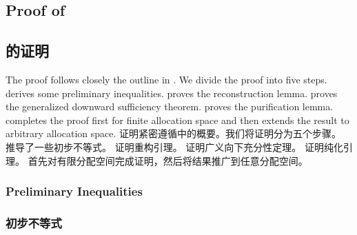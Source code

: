 \documentclass[12pt,letterpaper]{article}
\newenvironment{original}{\color{black}\noindent}{}
\newenvironment{translation}{\color{blue}\noindent}{}
\theoremstyle{plain}
\theoremstyle{definition}
\theoremstyle{remark}
\renewcommand{\1}{\mathds{1}}
\theoremstyle{definition}
\begin{document}
\begin{original}
\subsection{Proof of \texorpdfstring{}{}}
\end{original}
\begin{translation}
\subsection{\texorpdfstring{}{}的证明}
\end{translation}

\begin{original}
The proof follows closely the outline in . We divide the proof into five steps.  derives some preliminary inequalities.  proves the reconstruction lemma.  proves the generalized downward sufficiency theorem.  proves the purification lemma.  completes the proof first for finite allocation space and then extends the result to arbitrary allocation space.
\end{original}
\begin{translation}
证明紧密遵循中的概要。我们将证明分为五个步骤。 推导了一些初步不等式。 证明重构引理。 证明广义向下充分性定理。 证明纯化引理。 首先对有限分配空间完成证明，然后将结果推广到任意分配空间。
\end{translation}

\begin{original}
\subsubsection{Preliminary Inequalities}\label{subsec:prelim}
\end{original}
\begin{translation}
\subsubsection{初步不等式}\label{subsec:prelim}
\end{translation}
\end{document}
